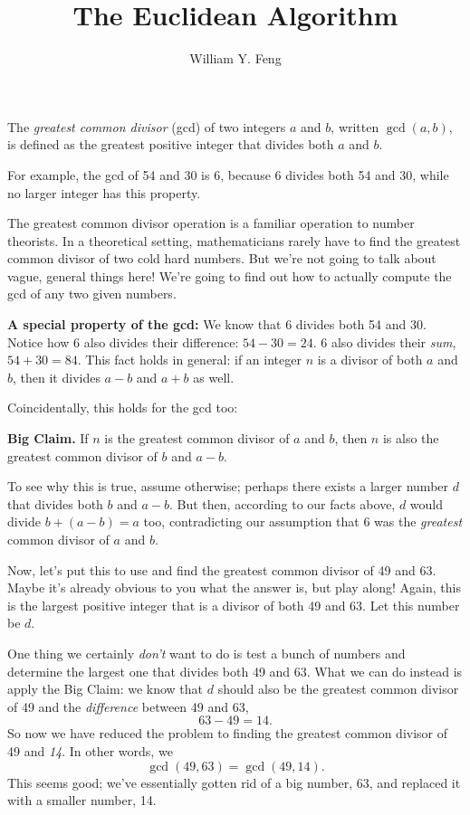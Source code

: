 \documentclass{article}
\title{The Euclidean Algorithm}
\author{William Y. Feng}
\begin{document}
\maketitle
The \textit{greatest common divisor} (gcd) of two integers $a$ and $b$, written $\gcd(a, b)$, is defined as the greatest positive integer that divides both $a$ and $b$.

For example, the gcd of 54 and 30 is 6, because 6 divides both 54 and 30, while no larger integer has this property.

The greatest common divisor operation is a familiar operation to number theorists. In a theoretical setting, mathematicians rarely have to find the greatest common divisor of two cold hard numbers. But we're not going to talk about vague, general things here! We're going to find out how to actually compute the gcd of any two given numbers.

\textbf{A special property of the gcd:} We know that 6 divides both 54 and 30. Notice how 6 also divides their difference: $54 - 30 = 24$. 6 also divides their \textit{sum}, $54 + 30 = 84$. This fact holds in general: if an integer $n$ is a divisor of both $a$ and $b$, then it divides $a - b$ and $a + b$ as well.

Coincidentally, this holds for the gcd too:

\textbf{Big Claim.} If $n$ is the greatest common divisor of $a$ and $b$, then $n$ is also the greatest common divisor of $b$ and $a - b$.

To see why this is true, assume otherwise; perhaps there exists a larger number $d$ that divides both $b$ and $a - b$. But then, according to our facts above, $d$ would divide $b + (a - b) = a$ too, contradicting our assumption that 6 was the \textit{greatest} common divisor of $a$ and $b$.

Now, let's put this to use and find the greatest common divisor of 49 and 63. Maybe it's already obvious to you what the answer is, but play along! Again, this is the largest positive integer that is a divisor of both 49 and 63. Let this number be $d$.

One thing we certainly \textit{don't} want to do is test a bunch of numbers and determine the largest one that divides both 49 and 63. What we can do instead is apply the Big Claim: we know that $d$ should also be the greatest common divisor of 49 and the \textit{difference} between 49 and 63,
$$63 - 49 = 14.$$
So now we have reduced the problem to finding the greatest common divisor of 49 and \textit{14}. In other words, we
$$\gcd(49, 63) = \gcd(49, 14).$$
This seems good; we've essentially gotten rid of a big number, 63, and replaced it with a smaller number, 14.
\end{document}
